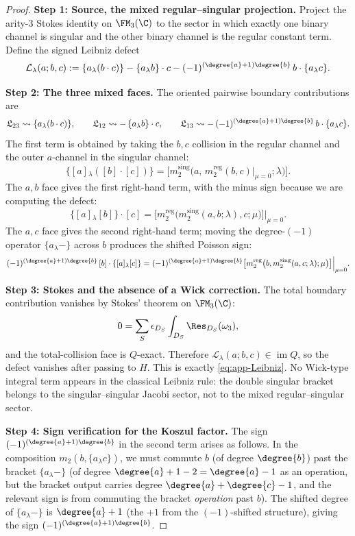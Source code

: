 \begin{proof}
\textbf{Step 1: Source, the mixed regular--singular projection.}
Project the arity-$3$ Stokes identity on $\FM_3(\C)$ to the sector in
which exactly one binary channel is singular and the other binary
channel is the regular constant term.  Define the signed Leibniz
defect
\[
\mathcal L_\lambda(a;b,c)
:=
\{a{}_\lambda (b\cdot c)\}
-
\{a{}_\lambda b\}\cdot c
-
(-1)^{(\degree{a}+1)\degree{b}}\,
b\cdot\{a{}_\lambda c\}.
\]

\textbf{Step 2: The three mixed faces.}
The oriented pairwise boundary contributions are
\[
\mathfrak L_{23}\leadsto \{a{}_\lambda(b\cdot c)\},\qquad
\mathfrak L_{12}\leadsto -\,\{a{}_\lambda b\}\cdot c,\qquad
\mathfrak L_{13}\leadsto
-\,(-1)^{(\degree{a}+1)\degree{b}}\,
b\cdot\{a{}_\lambda c\}.
\]
The first term is obtained by taking the \(b,c\) collision in the
regular channel and the outer \(a\)-channel in the singular channel:
\[
\{[a]{}_\lambda ([b]\cdot [c])\}
=
\bigl[
m_2^{\mathrm{sing}}\bigl(a,\,
m_2^{\mathrm{reg}}(b,c)\big|_{\mu=0};\lambda\bigr)
\bigr].
\]
The \(a,b\) face gives the first right-hand term, with the minus sign
because we are computing the defect:
\[
\{[a]{}_\lambda [b]\}\cdot [c]
=
\bigl[
m_2^{\mathrm{reg}}\bigl(
m_2^{\mathrm{sing}}(a,b;\lambda),c;\mu\bigr)
\bigr]\Big|_{\mu=0}.
\]
The \(a,c\) face gives the second right-hand term; moving the
degree-\((-1)\) operator \(\{a{}_\lambda-\}\) across \(b\) produces the
shifted Poisson sign:
\[
(-1)^{(\degree{a}+1)\degree{b}}\,
[b]\cdot\{[a]{}_\lambda [c]\}
=
(-1)^{(\degree{a}+1)\degree{b}}
\bigl[
m_2^{\mathrm{reg}}\bigl(
b,m_2^{\mathrm{sing}}(a,c;\lambda);\mu\bigr)
\bigr]\Big|_{\mu=0}.
\]

\textbf{Step 3: Stokes and the absence of a Wick correction.}
The total boundary contribution vanishes by Stokes' theorem on $\FM_3(\C)$:
\[
0 = \sum_S \epsilon_{D_S}\int_{D_S}\Res_{D_S}(\omega_3),
\]
and the total-collision face is \(Q\)-exact.  Therefore
\(\mathcal L_\lambda(a;b,c)\in\operatorname{im}Q\), so the defect
vanishes after passing to \(H\).  This is exactly
\eqref{eq:app-Leibniz}.  No Wick-type integral term appears in the
classical Leibniz rule: the double singular bracket belongs to the
singular--singular Jacobi sector, not to the mixed regular--singular
sector.

\textbf{Step 4: Sign verification for the Koszul factor.}
The sign $(-1)^{(\degree{a}+1)\degree{b}}$ in the second term arises as follows. In the composition $m_2(b, \{a{}_\lambda c\})$, we must commute $b$ (of degree $\degree{b}$) past the bracket $\{a{}_\lambda -\}$ (of degree $\degree{a}+1-2 = \degree{a}-1$ as an operation, but the bracket output carries degree $\degree{a}+\degree{c}-1$, and the relevant sign is from commuting the bracket \emph{operation} past $b$). The shifted degree of $\{a{}_\lambda -\}$ is $\degree{a}+1$ (the $+1$ from the $(-1)$-shifted structure), giving the sign $(-1)^{(\degree{a}+1)\degree{b}}$.
\end{proof}

